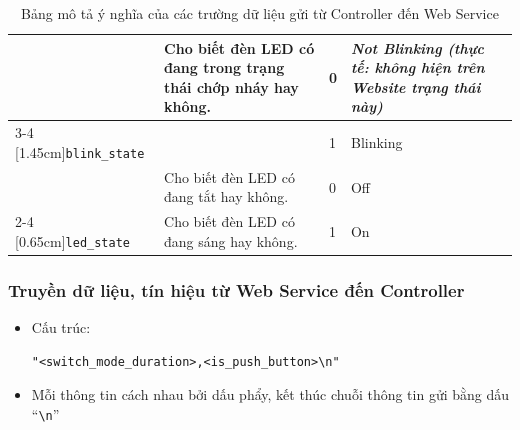 {\begin{table}[H]
\begin{tabular}{|p{4cm}|p{5cm}|p{2.5cm}|p{3.5cm}|}
{}                               & {Cho biết đèn LED có đang trong trạng thái chớp nháy hay không.}                                                                                                                                                                                                                                              & {0}                    & {\textit{Not Blinking (thực tế: không hiện trên Website trạng thái này)}} \\ \cline{3-4} 
\multirow{-2}{*}[1.45cm]{{\texttt{blink\_state}}} &{}                                                                                                                                  & {1}                    & {Blinking}                                                                \\ \hline
{}                               & {Cho biết đèn LED có đang tắt hay không.}                                                                                                                                                                                                       & {0}                    & {Off}                                                                     \\ \cline{2-4} 
\multirow{-2}{*}[0.65cm]{{\texttt{led\_state}}}   & {Cho biết đèn LED có đang sáng hay không.}                                                                                                                                                                                                      & {1}                    & {On}                                                                      \\ \hline
\end{tabular}
\caption{Bảng mô tả ý nghĩa của các trường dữ liệu gửi từ Controller đến Web Service}
\label{tab:my_label}
\end{table}

\pagebreak
\subsubsection{Truyền dữ liệu, tín hiệu từ Web Service đến Controller}\label{subsec:data_Web_to_UNO}
\begin{itemize}
    \item Cấu trúc:
    \begin{lstlisting}
"<switch_mode_duration>,<is_push_button>\n"\end{lstlisting}
    \item Mỗi thông tin cách nhau bởi dấu phẩy, kết thúc chuỗi thông tin gửi bằng dấu “\verb|\n|”
\end{itemize}

}

